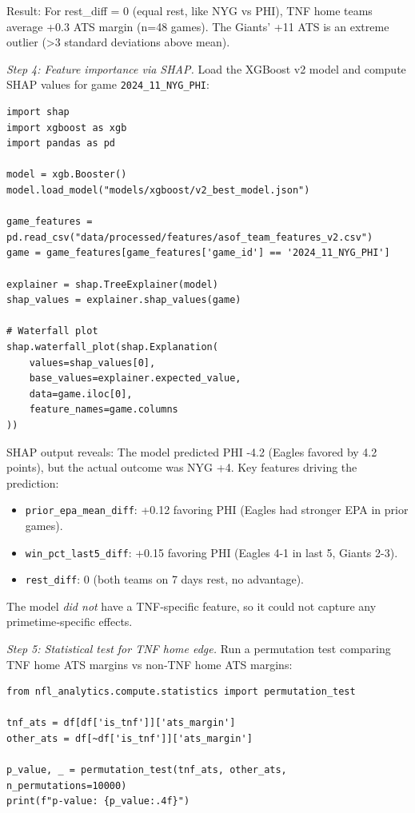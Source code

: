 Result: For rest\_diff = 0 (equal rest, like NYG vs PHI), TNF home teams average +0.3 ATS margin (n=48 games). The Giants' +11 ATS is an extreme outlier (>3 standard deviations above mean).

\textit{Step 4: Feature importance via SHAP.}
Load the XGBoost v2 model and compute SHAP values for game \texttt{2024\_11\_NYG\_PHI}:
\begin{verbatim}
import shap
import xgboost as xgb
import pandas as pd

model = xgb.Booster()
model.load_model("models/xgboost/v2_best_model.json")

game_features = pd.read_csv("data/processed/features/asof_team_features_v2.csv")
game = game_features[game_features['game_id'] == '2024_11_NYG_PHI']

explainer = shap.TreeExplainer(model)
shap_values = explainer.shap_values(game)

# Waterfall plot
shap.waterfall_plot(shap.Explanation(
    values=shap_values[0],
    base_values=explainer.expected_value,
    data=game.iloc[0],
    feature_names=game.columns
))
\end{verbatim}

SHAP output reveals: The model predicted PHI -4.2 (Eagles favored by 4.2 points), but the actual outcome was NYG +4. Key features driving the prediction:
\begin{itemize}
\item \texttt{prior\_epa\_mean\_diff}: +0.12 favoring PHI (Eagles had stronger EPA in prior games).
\item \texttt{win\_pct\_last5\_diff}: +0.15 favoring PHI (Eagles 4-1 in last 5, Giants 2-3).
\item \texttt{rest\_diff}: 0 (both teams on 7 days rest, no advantage).
\end{itemize}

The model \textit{did not} have a TNF‑specific feature, so it could not capture any primetime‑specific effects.

\textit{Step 5: Statistical test for TNF home edge.}
Run a permutation test comparing TNF home ATS margins vs non‑TNF home ATS margins:
\begin{verbatim}
from nfl_analytics.compute.statistics import permutation_test

tnf_ats = df[df['is_tnf']]['ats_margin']
other_ats = df[~df['is_tnf']]['ats_margin']

p_value, _ = permutation_test(tnf_ats, other_ats, n_permutations=10000)
print(f"p-value: {p_value:.4f}")
\end{verbatim}

